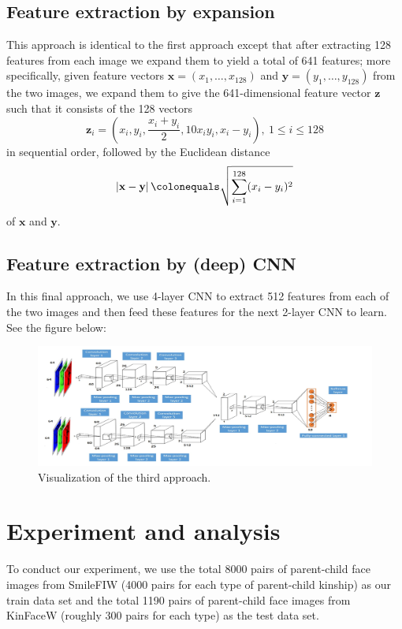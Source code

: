\documentclass{article}
\newcommand{\vect}[1]{\mathbf{#1}}
\newcommand{\defas}{\colonequals}
\newcommand{\abs}[1]{\left|#1\right|}
\newcommand{\paren}[1]{\left(#1\right)}
\begin{document}
\subsection{Feature extraction by expansion} %
This approach is identical to the first approach except that after extracting 128 features from each image we expand them to yield a total of 641 features; more specifically, given feature vectors $\vect{x} = (x_1, \ldots, x_{128})$ and $\vect{y} = (y_1, \ldots, y_{128})$ from the two images, we expand them to give the 641-dimensional feature vector $\vect{z}$ such that it consists of the 128 vectors
\[
\vect{z}_i = \paren{x_i, y_i, \frac{x_i + y_i}{2}, 10x_iy_i, x_i - y_i}, \  1 \leq i \leq 128
\]
in sequential order, followed by the Euclidean distance
\[
\abs{\vect{x} - \vect{y}} \defas \sqrt{\sum^{128}_{i = 1} (x_i - y_i)^2}
\]
of $\vect{x}$ and $\vect{y}$.

\subsection{Feature extraction by (deep) CNN} %
In this final approach, we use 4-layer CNN to extract 512 features from each of the two images and then feed these features for the next 2-layer CNN to learn. See the figure below:
\begin{figure}[h]
  \centering
  \includegraphics[width=12cm]{CNN_2.png}
  \caption{Visualization of the third approach.}
\end{figure}

\section{Experiment and analysis}
To conduct our experiment, we use the total 8000 pairs of parent-child face images from SmileFIW (4000 pairs for each type of parent-child kinship) as our train data set and the total 1190 pairs of parent-child face images from KinFaceW (roughly 300 pairs for each type) as the test data set.
\end{document}
